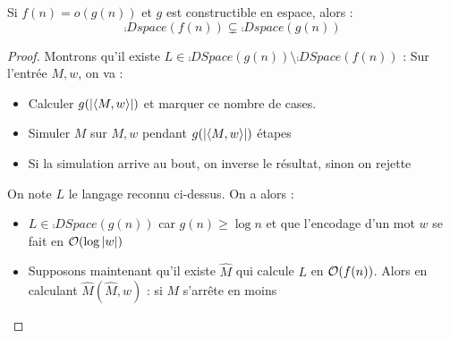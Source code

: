 \documentclass{cours}
\begin{document}
\begin{theorem}
    Si $f(n) = o(g(n))$ et $g$ est constructible en espace, alors : 
    \[
        \comp{Dspace}(f(n)) \subsetneq \comp{Dspace}(g(n))
    \]
\end{theorem}
\begin{proof}
    Montrons qu'il existe $L \in \comp{DSpace}(g(n)) \setminus \comp{DSpace}(f(n))$ : Sur l'entrée $M, w$, on va : 
    \begin{itemize}
        \item Calculer $g(\left|\left\langle M, w \right\rangle\right|)$ et marquer ce nombre de cases.
        \item Simuler $M$ sur $M, w$ pendant $g(\left|\left\langle M, w \right\rangle\right|)$ étapes
        \item Si la simulation arrive au bout, on inverse le résultat, sinon on rejette
    \end{itemize}
    On note $L$ le langage reconnu ci-dessus. On a alors : 
    \begin{itemize}
        \item $L \in \comp{DSpace}(g(n))$ car $g(n) \geq \log n$ et que l'encodage d'un mot $w$ se fait en $\mathcal{O}(\log \left|w\right|)$
        \item Supposons maintenant qu'il existe $\hat{M}$ qui calcule $L$ en $\mathcal{O}(f(n))$. Alors en calculant $\hat{M}(\hat{M}, w)$ : si $M$ s'arrête en moins   
    \end{itemize}
\end{proof}
\end{document}

